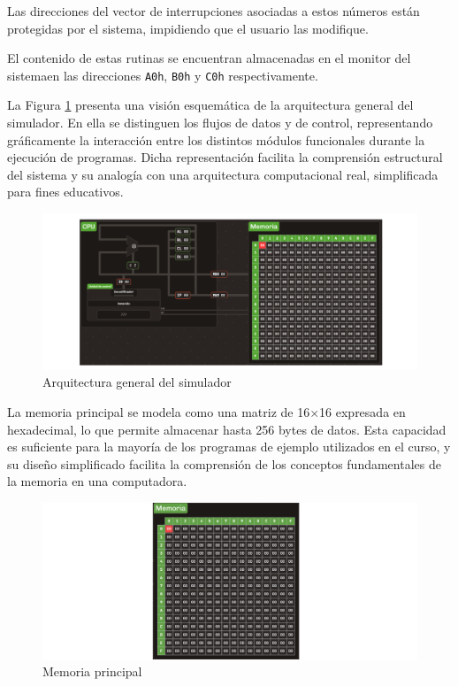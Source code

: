 \documentclass[12pt,oneside]{templates/unerthesis}
\begin{document}
Las direcciones del vector de interrupciones asociadas a estos números están protegidas por el sistema, impidiendo que el usuario las modifique.

El contenido de estas rutinas se encuentran almacenadas en el monitor del sistemaen las direcciones \texttt{A0h}, \texttt{B0h} y \texttt{C0h} respectivamente.

La Figura \ref{fig:esquemavonsim8} presenta una visión esquemática de la arquitectura general del simulador. En ella se distinguen los flujos de datos y de control, representando gráficamente la interacción entre los distintos módulos funcionales durante la ejecución de programas. Dicha representación facilita la comprensión estructural del sistema y su analogía con una arquitectura computacional real, simplificada para fines educativos.

\begin{figure}

{\centering \includegraphics[width=0.85\linewidth]{images/esquemavonsim8} 

}

\caption{Arquitectura general del simulador}\label{fig:esquemavonsim8}
\end{figure}

La memoria principal se modela como una matriz de 16×16 expresada en hexadecimal, lo que permite almacenar hasta 256 bytes de datos. Esta capacidad es suficiente para la mayoría de los programas de ejemplo utilizados en el curso, y su diseño simplificado facilita la comprensión de los conceptos fundamentales de la memoria en una computadora.

\begin{figure}

{\centering \includegraphics[width=0.85\linewidth]{images/memoria} 

}

\caption{Memoria principal}\label{fig:memoria}
\end{figure}
\end{document}
